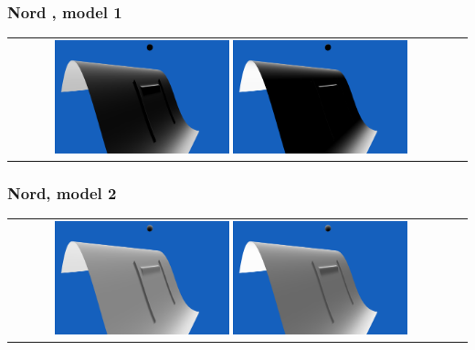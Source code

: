 \documentclass[a4paper]{article}
\begin{document}
\subsubsection{Nord , model 1}
\begin{tabular}{cc}
\includegraphics[width=0.4\textwidth]{Images/Essais/Essai_7_phong_North_0.png}
\includegraphics[width=0.4\textwidth]{Images/Essais/Essai_7_slint_North_0.png}
\end{tabular}

\subsubsection{Nord, model 2}
\begin{tabular}{cc}
\includegraphics[width=0.4\textwidth]{Images/Essais/Essai_7_phong_North_1.png}
\includegraphics[width=0.4\textwidth]{Images/Essais/Essai_7_slint_North_1.png}
\end{tabular}
\end{document}
